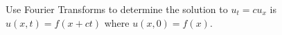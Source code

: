 \item Use Fourier Transforms to determine the solution to $u_t = cu_x$ is $u(x, t) = f(x + ct)$ where $u(x, 0) = f(x)$.








